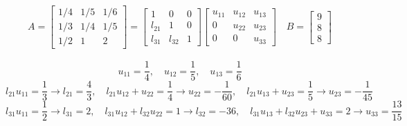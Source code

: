\[
\begin{aligned}
    A=
    \left[
    \begin{array}{ccc}
        1/4 & 1/5 & 1/6 \\
        1/3 & 1/4 & 1/5 \\
        1/2 & 1 & 2
    \end{array}
    \right]
    =
    \left[
    \begin{array}{ccc}
        1 & 0 & 0 \\
        l_{21} & 1 & 0 \\
        l_{31} & l_{32} & 1
    \end{array}
    \right]
    \left[
    \begin{array}{ccc}
        u_{11} & u_{12} & u_{13} \\
        0 & u_{22} & u_{23} \\
        0 & 0 & u_{33}
    \end{array}
    \right]
    \quad
    B=
    \left[
    \begin{array}{c}
        9  \\
        8  \\
        8 
    \end{array}
    \right]
\end{aligned}
\]

\[
u_{11}=\frac{1}{4}, \quad u_{12}=\frac{1}{5}, \quad u_{13}=\frac{1}{6}
\]
\[
l_{21}u_{11}=\frac{1}{3}\xrightarrow{}l_{21}=\frac{4}{3}, \quad l_{21}u_{12}+u_{22}=\frac{1}{4}\xrightarrow{}u_{22}=-\frac{1}{60}, \quad l_{21}u_{13}+u_{23}=\frac{1}{5}\xrightarrow{}u_{23}=-\frac{1}{45}
\]
\[
l_{31}u_{11}=\frac{1}{2}\xrightarrow{}l_{31}=2, \quad l_{31}u_{12}+l_{32}u_{22}=1\xrightarrow{}l_{32}=-36, \quad l_{31}u_{13}+l_{32}u_{23}+u_{33}=2\xrightarrow{}u_{33}=\frac{13}{15}
\]

